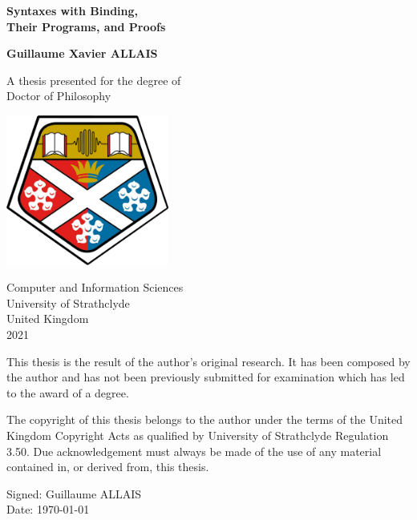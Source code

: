 \begin{titlingpage}
    \begin{center}
        \vspace*{1cm}

        \Huge
        \textbf{Syntaxes with Binding, \\ Their Programs, and Proofs}

        \vspace{1.5cm}

        \LARGE

        \textbf{Guillaume Xavier ALLAIS}

        \vfill

        A thesis presented for the degree of\\
        Doctor of Philosophy

        \vspace{0.8cm}

        \includegraphics[width=0.4\textwidth]{strath_coat}

        \vspace{0.8cm}

        \Large
        Computer and Information Sciences\\
        University of Strathclyde\\
        United Kingdom\\
        2021

    \end{center}
\end{titlingpage}


\pagebreak
{
\Large
\hspace{0pt}
\vfill{}
This thesis is the result of the author’s original research. It has been
composed by the author and has not been previously submitted for
examination which has led to the award of a degree.

The copyright of this thesis belongs to the author under the terms of the
United Kingdom Copyright Acts as qualified by University of Strathclyde
Regulation 3.50. Due acknowledgement must always be made of the use of
any material contained in, or derived from, this thesis.

\vspace{1.5cm}

\hfill
\begin{minipage}{0.4\textwidth}
Signed: Guillaume ALLAIS \\
Date: \today{}
\end{minipage}
\vfill
\hspace{0pt}
}
\pagebreak

